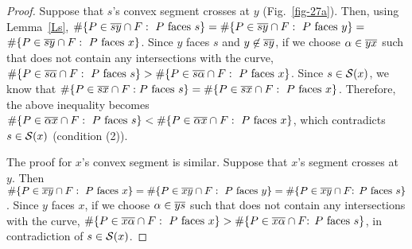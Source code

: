 \begin{proof}
Suppose that $s$'s convex segment crosses  at $y$ 
(Fig.~\ref{fig-27a}).
Then, using Lemma~\ref{Ls}, $\#\{P \in \mbox{$\overline{sy}$} \cap F: \mbox{ $P$ 
faces $s$}\} = 
\#\{P \in \mbox{$\overline{sy}$} \cap F: \mbox{ $P$ faces $y$}\} =$
\mbox{$\#\{P \in \mbox{$\overline{sy}$} \cap F: \mbox{ $P$ faces $x$}\}$}.
Since $y$ faces $s$ and $y \not\in \mbox{$\overline{sy}$}$, 
if we choose $\alpha \in \mbox{$\overline{yx}$}$ such that  
does not contain any intersections with the curve, 
$\#\{P \in \mbox{$\overline{s\alpha}$} \cap F: \mbox{ $P$ faces $s$}\} >
\#\{P \in \mbox{$\overline{s\alpha}$} \cap F: \mbox{ $P$ faces $x$}\}$.
Since $s \in {\cal S}(x)$, we know that 
$\#\{P \in \mbox{$\overline{sx}$} \cap F: \mbox{$P$ faces $s$}\} =
\#\{P \in \mbox{$\overline{sx}$} \cap F: \mbox{ $P$ faces $x$}\}$.
Therefore, the above inequality 
becomes $\#\{P \in \mbox{$\overline{\alpha x}$} \cap F: \mbox{ $P$ faces $s$}\} <
\#\{P \in \mbox{$\overline{\alpha x}$} \cap F: \mbox{ $P$ faces $x$}\}$, 
which contradicts $s \in {\cal S}(x)$ (condition (2)).


The proof for $x$'s convex segment is similar.
Suppose that $x$'s segment crosses  at $y$.
Then $\#\{P \in \mbox{$\overline{xy}$} \cap F: \mbox{ $P$ faces $x$}\} = 
\#\{P \in \mbox{$\overline{xy}$} \cap F: \mbox{ $P$ faces $y$}\} = 
\mbox{$\#\{P \in \mbox{$\overline{xy}$} \cap F$: $P$ faces $s$\}}$.
Since $y$ faces $x$, if we choose $\alpha \in \mbox{$\overline{ys}$}$ such that 
does not contain any intersections with the curve, 
$\#\{P \in \mbox{$\overline{x\alpha}$} \cap F: \mbox{ $P$ faces $x$}\} 
> \mbox{$\#\{P \in \mbox{$\overline{x\alpha}$} \cap F$: $P$ faces $s$\}}$,
in contradiction of $s \in {\cal S}(x)$.
\end{proof}

